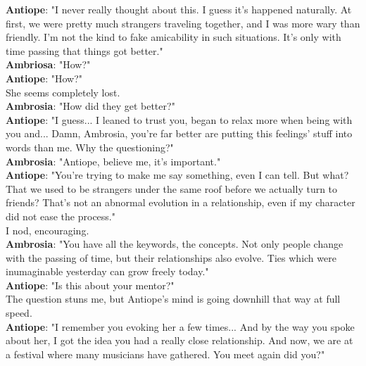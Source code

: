 \documentclass{report}
\newcommand{\speaker}[1]{
	\textbf{#1}: 
}
\begin{document}
\speaker{Antiope} "I never really thought about this. I guess it's happened naturally. At first, we were pretty much strangers traveling together, and I was more wary than friendly. I'm not the kind to fake amicability in such situations. It's only with time passing that things got better."\\

\speaker{Ambriosa} "How?"\\

\speaker{Antiope} "How?"\\

She seems completely lost.\\

\speaker{Ambrosia} "How did they get better?"\\

\speaker{Antiope} "I guess... I leaned to trust you, began to relax more when being with you and... Damn, Ambrosia, you're far better are putting this feelings' stuff into words than me. Why the questioning?"\\

\speaker{Ambrosia} "Antiope, believe me, it's important."\\

\speaker{Antiope} "You're trying to make me say something, even I can tell. But what? That we used to be strangers under the same roof before we actually turn to friends? That's not an abnormal evolution in a relationship, even if my character did not ease the process."\\

I nod, encouraging.\\

\speaker{Ambrosia} "You have all the keywords, the concepts. Not only people change with the passing of time, but their relationships also evolve. Ties which were inumaginable yesterday can grow freely today."\\

\speaker{Antiope} "Is this about your mentor?"\\

The question stuns me, but Antiope's mind is going downhill that way at full speed.\\

\speaker{Antiope} "I remember you evoking her a few times... And by the way you spoke about her, I got the idea you had a really close relationship. And now, we are at a festival where many musicians have gathered. You meet again did you?"\\
\end{document}
